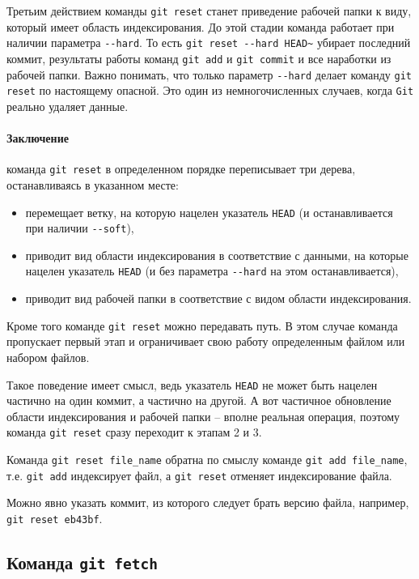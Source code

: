\documentclass[%
	11pt,
	a4paper,
	utf8,
		]{article}
\begin{document}
Третьим действием команды \texttt{git reset} станет приведение рабочей папки к виду, который имеет область индексирования. До этой стадии команда работает при наличии параметра \verb|--hard|. То есть \verb|git reset --hard HEAD~| убирает последний коммит, результаты работы команд \texttt{git add} и \texttt{git commit} и все наработки из рабочей папки. Важно понимать, что только параметр \verb|--hard| делает команду \texttt{git reset} по настоящему опасной. Это один из немногочисленных случаев, когда \texttt{Git} реально удаляет данные. 

\paragraph{Заключение} команда \texttt{git reset} в определенном порядке переписывает три дерева, останавливаясь в указанном месте:
\begin{itemize}
	\item перемещает ветку, на которую нацелен указатель \texttt{HEAD} (и останавливается при наличии \verb|--soft|),
	
	\item приводит вид области индексирования в соответствие с данными, на которые нацелен указатель \texttt{HEAD} (и без параметра \verb|--hard| на этом останавливается),
	
	\item приводит вид рабочей папки в соответствие с видом области индексирования.
\end{itemize}

Кроме того команде \texttt{git reset} можно передавать путь. В этом случае команда пропускает первый этап и ограничивает свою работу определенным файлом или набором файлов.

Такое поведение имеет смысл, ведь указатель \texttt{HEAD} не может быть нацелен частично на один коммит, а частично на другой. А вот частичное обновление области индексирования и рабочей папки -- вполне реальная операция, поэтому команда \texttt{git reset} сразу переходит к этапам 2 и 3.

Команда \texttt{git reset file\_name} обратна по смыслу команде \texttt{git add file\_name}, т.е. \texttt{git add} индексирует файл, а \texttt{git reset} отменяет индексирование файла.

Можно явно указать коммит, из которого следует брать версию файла, например, \texttt{git reset eb43bf}.

\subsection{Команда \texttt{git fetch}}
\end{document}
